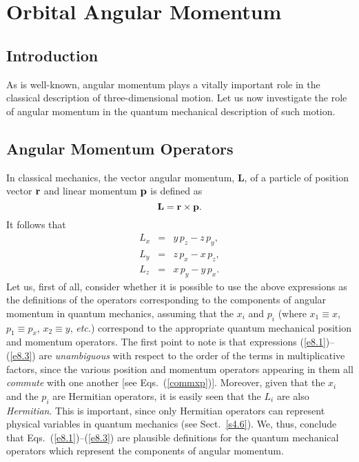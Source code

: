 \chapter{Orbital Angular Momentum}\label{sorb}
\section{Introduction}
As is well-known, angular momentum plays a vitally important role in the classical description
of three-dimensional motion. Let us now investigate the role of angular momentum in the quantum mechanical description of such motion.

\section{Angular Momentum Operators}\label{s8.2}
In classical mechanics, the vector angular momentum, {\bf L}, of a particle of 
position vector ${\bf r}$ and linear momentum
${\bf p}$ is defined as
\begin{equation}\label{e8.0}
{\bf L} = {\bf r}\times {\bf p}.
\end{equation}
It follows that
\begin{eqnarray}\label{e8.1}
L_x &=& y\,p_z - z\,p_y,\\[0.5ex]
L_y &=& z\,p_x - x\,p_z,\\[0.5ex]
L_z &=& x\,p_y - y\,p_x.\label{e8.3}
\end{eqnarray}
Let us, first of all, consider whether it is possible to use the above expressions as the
definitions of the operators corresponding to the components of angular
momentum in quantum mechanics, assuming that the $x_i$ and $p_i$ (where $x_1\equiv x$, $p_1\equiv p_x$, $x_2\equiv y$, {\em etc.})
correspond to the appropriate quantum mechanical position and momentum operators. The first point to note is that expressions (\ref{e8.1})--(\ref{e8.3}) are {\em unambiguous} with respect to the order of the terms in multiplicative factors, since the various position and momentum operators
appearing in them all {\em commute}\/
with one another [see Eqs.~(\ref{commxp})]. Moreover, given that the $x_i$ and
the $p_i$ are Hermitian operators, it is easily seen that the $L_i$ are
also {\em Hermitian}. This is important, since only Hermitian operators can represent physical variables in quantum mechanics (see Sect.~\ref{s4.6}).
We, thus, conclude that Eqs.~(\ref{e8.1})--(\ref{e8.3}) are plausible
definitions for the quantum mechanical operators which represent the components of angular momentum.

